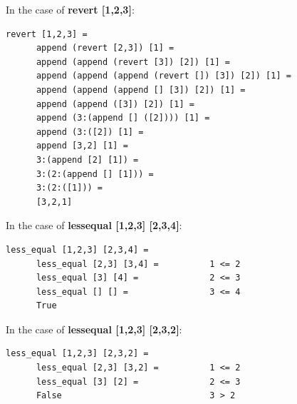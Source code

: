 \documentclass{article}
\theoremstyle{theorem}
\theoremstyle{definition}
\theoremstyle{remark}
\begin{document}
In the case of \textbf{revert [1,2,3]}:
\begin{lstlisting}
revert [1,2,3] =
      append (revert [2,3]) [1] =
      append (append (revert [3]) [2]) [1] =
      append (append (append (revert []) [3]) [2]) [1] =
      append (append (append [] [3]) [2]) [1] =
      append (append ([3]) [2]) [1] =
      append (3:(append [] ([2]))) [1] =
      append (3:([2]) [1] =
      append [3,2] [1] =
      3:(append [2] [1]) =
      3:(2:(append [] [1])) =
      3:(2:([1])) =
      [3,2,1]
\end{lstlisting}
In the case of \textbf{less\textunderscore equal [1,2,3] [2,3,4]}:
\begin{lstlisting}
less_equal [1,2,3] [2,3,4] =
      less_equal [2,3] [3,4] =          1 <= 2
      less_equal [3] [4] =              2 <= 3
      less_equal [] [] =                3 <= 4
      True
\end{lstlisting}
In the case of \textbf{less\textunderscore equal [1,2,3] [2,3,2]}:
\begin{lstlisting}
less_equal [1,2,3] [2,3,2] =
      less_equal [2,3] [3,2] =          1 <= 2
      less_equal [3] [2] =              2 <= 3
      False                             3 > 2
\end{lstlisting}
\end{document}

